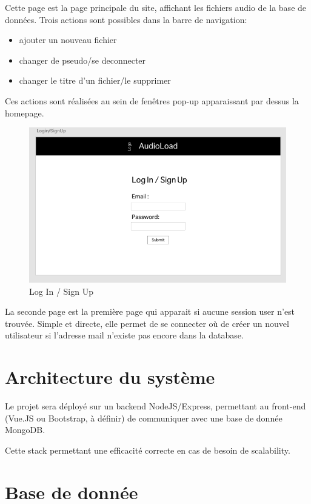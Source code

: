 \documentclass[a4paper,12pt,french]{article}
\begin{document}
Cette page est la page principale du site, affichant les fichiers audio de la base de données.
Trois actions sont possibles dans la barre de navigation:

\begin{itemize}
	\item ajouter un nouveau fichier
	\item changer de pseudo/se deconnecter
	\item changer le titre d'un fichier/le supprimer
\end{itemize}

Ces actions sont réalisées au sein de fenêtres pop-up apparaissant par dessus la homepage.

\begin{figure}[ht]
\centering
\includegraphics[width=13cm]{../prototype/login}
\caption{Log In / Sign Up}
\end{figure}

La seconde page est la première page qui apparait si aucune session user n'est trouvée.
Simple et directe, elle permet de se connecter où de créer un nouvel utilisateur si l'adresse mail n'existe pas encore dans la database.

\section{Architecture du système}

Le projet sera déployé sur un backend NodeJS/Express, 
permettant au front-end (Vue.JS ou Bootstrap, à définir) 
de communiquer avec une base de donnée MongoDB.
\par
Cette stack permettant une efficacité correcte en cas de besoin de scalability.
\section{Base de donnée}
\end{document}
